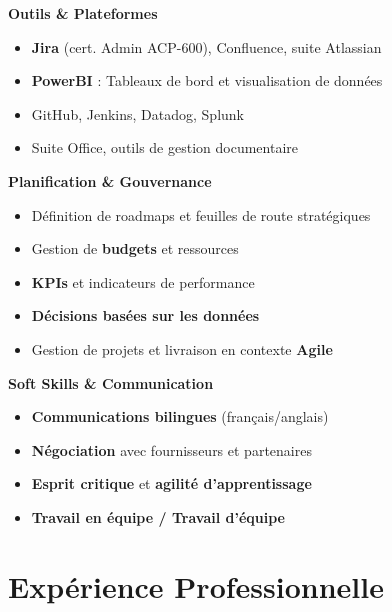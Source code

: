 \documentclass[11pt,a4paper]{article}
\newcommand{\highlight}[1]{\textcolor{primaryblue}{\textbf{#1}}}
\newcommand{\skilltitle}[1]{\normalsize\textcolor{primaryblue}{\textbf{#1}}}
\begin{document}
\hfill
\begin{minipage}[t]{0.42\textwidth}
\skilltitle{Outils \& Plateformes}
\begin{itemize}[leftmargin=10pt]
    \item \highlight{Jira} (cert. Admin ACP-600), Confluence, suite Atlassian
    \item \highlight{PowerBI} : Tableaux de bord et visualisation de données
    \item GitHub, Jenkins, Datadog, Splunk
    \item Suite Office, outils de gestion documentaire
\end{itemize}

\skilltitle{Planification \& Gouvernance}
\begin{itemize}[leftmargin=10pt]
    \item Définition de roadmaps et feuilles de route stratégiques
    \item Gestion de \highlight{budgets} et ressources
    \item \highlight{KPIs} et indicateurs de performance
    \item \highlight{Décisions basées sur les données}
    \item Gestion de projets et livraison en contexte \highlight{Agile}
\end{itemize}

\skilltitle{Soft Skills \& Communication}
\begin{itemize}[leftmargin=10pt]
    \item \highlight{Communications bilingues} (français/anglais)
    \item \highlight{Négociation} avec fournisseurs et partenaires
    \item \highlight{Esprit critique} et \highlight{agilité d'apprentissage}
    \item \highlight{Travail en équipe / Travail d'équipe}
\end{itemize}
\end{minipage}


\section*{Expérience Professionnelle}
\end{document}
